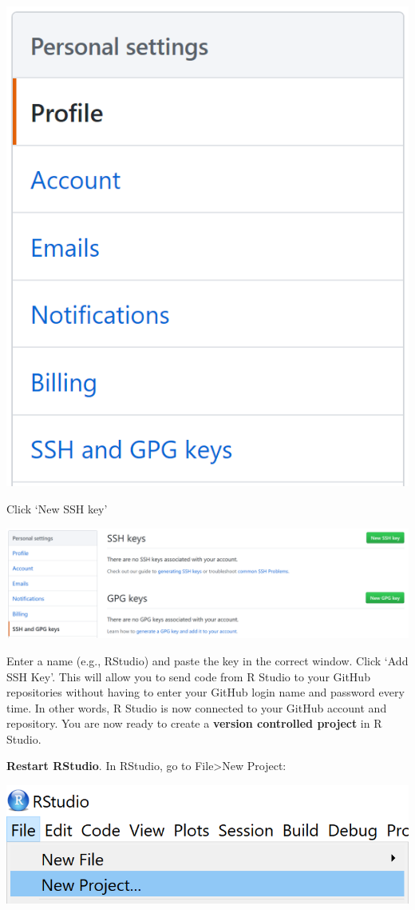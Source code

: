 \documentclass[
  oneside]{krantz}
\begin{document}
\begin{center}\includegraphics[width=0.5\linewidth]{images/e949d47fdc97cef38499f82cb70f7e11} \end{center}

Click `New SSH key'

\begin{center}\includegraphics[width=1\linewidth]{images/02ee9504ceacd79b3706f18e8497ed43} \end{center}

Enter a name (e.g., RStudio) and paste the key in the correct window. Click `Add
SSH Key'. This will allow you to send code from R Studio to your GitHub
repositories without having to enter your GitHub login name and password every
time. In other words, R Studio is now connected to your GitHub account and
repository. You are now ready to create a \textbf{version controlled project} in R
Studio.

\textbf{Restart RStudio}. In RStudio, go to File\textgreater New Project:

\begin{center}\includegraphics[width=1\linewidth]{images/7549d0317ad5f80afe7f3c6be4ad0ba3} \end{center}
\end{document}
